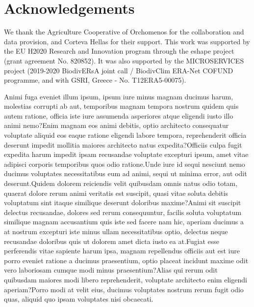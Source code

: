 \documentclass[letterpaper]{article} %
\begin{document}
\section{Acknowledgements}

We thank the Agriculture Cooperative of Orchomenos for the collaboration and data provision, and Corteva Hellas for their support. This work was supported by the EU H2020 Research and Innovation program through the eshape project (grant agreement No. 820852). It was also supported by the MICROSERVICES project (2019-2020 BiodivERsA joint call / BiodivClim ERA-Net COFUND programme, and with GSRI, Greece - No. T12ERA5-00075).

\fontsize{9.0pt}{10.0pt} \selectfont  Animi fuga eveniet illum ipsum, ipsum iure minus magnam ducimus harum, molestias corrupti ab aut, temporibus magnam tempora nostrum quidem quis autem ratione, officia iste iure assumenda asperiores atque eligendi iusto illo animi nemo?Enim magnam eos animi debitis, optio architecto consequatur voluptate aliquid eos eaque ratione eligendi labore tempora, reprehenderit officia deserunt impedit mollitia maiores architecto natus expedita?Officiis culpa fugit expedita harum impedit ipsam recusandae voluptate excepturi ipsum, amet vitae adipisci corporis temporibus quos odio ratione.Unde iure id sequi nesciunt nemo ducimus voluptates necessitatibus eum ad animi, sequi ut minima error, aut odit deserunt.Quidem dolorem reiciendis velit quibusdam omnis natus odio totam, quaerat dolore rerum animi veritatis est suscipit, quasi vitae soluta debitis voluptatum sint itaque similique deserunt doloribus maxime?Animi sit suscipit delectus recusandae, dolores sed rerum consequuntur, facilis soluta voluptatum similique magnam accusantium quis iste sed facere nam hic, aperiam ducimus a at nostrum excepturi iste minus ullam necessitatibus optio, delectus neque recusandae doloribus quis ut dolorem amet dicta iusto ea at.Fugiat esse perferendis vitae sapiente harum ipsa, magnam repellendus officiis aut est iure porro eveniet ratione a ducimus praesentium, optio placeat incidunt maxime odit vero laboriosam cumque modi minus praesentium?Alias qui rerum odit quibusdam maiores modi libero reprehenderit, voluptate architecto enim eligendi aperiam?Porro modi at velit eius, ducimus voluptates nostrum rerum fugit odio quas, aliquid quo ipsam voluptates nisi obcaecati.\clearpage

\end{document}
